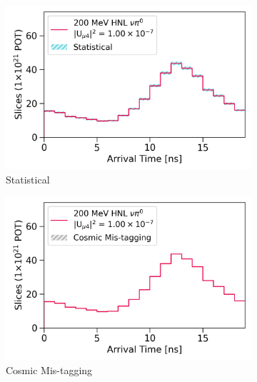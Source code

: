 \begin{figure}[htbp!]
        \begin{subfigure}[b]{0.495\textwidth}   
            \centering 
            \includegraphics[width=\textwidth]{hnl_statistics_error}
            \caption{Statistical}%
            \label{fig:hnl_stat}
        \end{subfigure}
        \hfill
        \begin{subfigure}[b]{0.495\textwidth}   
            \centering 
            \includegraphics[width=\textwidth]{hnl_mistagging_error}
            \caption{Cosmic Mis-tagging}%
            \label{fig:hnl_mistag}
        \end{subfigure}
        \centering
        \begin{subfigure}[b]{0.495\textwidth}   
            \centering 

\end{subfigure}
\end{figure}
